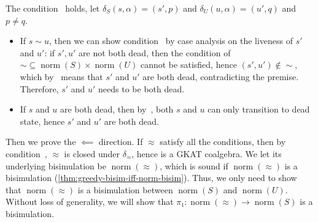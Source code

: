 \documentclass[conference]{IEEEtran}
\DeclareMathOperator{\norm}{\mathrm{norm}}
\begin{document}
\begin{proofEnd}
    The condition~ holds, let \(δ_S(s, α) = (s', p)\) and \(δ_U(u, α) = (u', q)\) and \(p ≠ q\). 
    \begin{itemize}
        \item If \(s ∼ u\), then we can show condition~ by case analysis on the liveness of \(s'\) and \(u'\):
        if \(s', u'\) are not both dead, then the condition of \({∼} ⊆ \norm(S) × \norm(U)\) cannot be satisfied, hence \((s', u') ∉ {∼}\), which by~ means that \(s'\) and \(u'\) are both dead, contradicting the premise.
        Therefore, \(s'\) and \(u'\) needs to be both dead.
        \item If \(s\) and \(u\) are both dead, then by~, both \(s\) and \(u\) can only transition to dead state, hence \(s'\) and \(u'\) are both dead.
    \end{itemize}

    Then we prove the \(⟸\) direction.
    If \(≈\) satisfy all the conditions, then by condition~, \(≈\) is closed under \(δ_≈\), hence is a GKAT coalgebra.
    We let its underlying bisimulation be \(\norm(≈)\), which is sound if \(\norm(≈)\) is a bisimulation (\cref{thm:greedy-bisim-iff-norm-bisim}).
    Thus, we only need to show that \(\norm(≈)\) is a bisimulation between \(\norm(S)\) and \(\norm(U)\). Without loss of generality, we will show that \(π₁: \norm(≈) → \norm(S)\) is a bisimulation.


\end{proofEnd}
\end{document}
